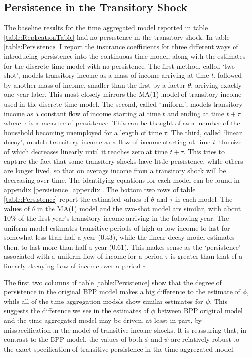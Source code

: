 

\subsection{Persistence in the Transitory Shock} \label{persistence}
The baseline results for the time aggregated model reported in table \ref{table:ReplicationTable} had no persistence in the transitory shock. In table \ref{table:Persistence} I report the insurance coefficients for three different ways of introducing persistence into the continuous time model, along with the estimates for the discrete time model with no persistence. The first method, called `two-shot', models transitory income as a mass of income arriving at time $t$, followed by another mass of income, smaller than the first by a factor $\theta$, arriving exactly one year later. This most closely mirrors the MA(1) model of transitory income used in the discrete time model. The second, called `uniform', models transitory income as a constant flow of income starting at time $t$ and ending at time $t+\tau$ where $\tau$ is a measure of persistence. This can be thought of as a member of the household becoming unemployed for a length of time $\tau$. The third, called `linear decay', models transitory income as a flow of income starting at time $t$, the size of which decreases linearly until it reaches zero at time $t+\tau$. This tries to capture the fact that some transitory shocks have little persistence, while others are longer lived, so that on average income from a transitory shock will be decreasing over time. The identifying equations for each model can be found in appendix \ref{persistence_appendix}. The bottom two rows of table \ref{table:Persistence} report the estimated values of $\theta$ and $\tau$ in each model. The values of $\theta$ in the MA(1) model and the two-shot model are similar, with about 10\% of the first year's transitory income arriving in the following year. The uniform model estimates transitive periods of high or low income to last for somewhat less than half a year (0.43), while the linear decay model estimates them to last more than half a year (0.61). This makes sense as the `persistence' associated with a uniform flow of income for a period $\tau$ is greater than that of a linearly decaying flow of income over a period $\tau$.

The first two columns of table \ref{table:Persistence} show that the degree of persistence in the original BPP model makes a big difference to the estimate of $\phi$, while all of the time aggregation models show similar estimates for $\psi$. This suggests the difference we see in the estimates of $\phi$ between BPP original model and the time aggregated model may be driven, at least in part, by misspecification in the model of transitive income shocks. It is reassuring that, in contrast to the BPP model, the values of both $\phi$ and $\psi$ are relatively robust to the exact specification of transitive persistence in the time aggregated model.

